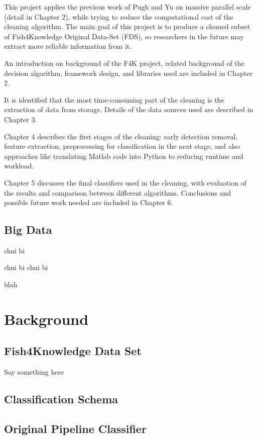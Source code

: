 \documentclass[bsc,logo,twoside,fullspacing,parskip]{infthesis}
\begin{document}

This project applies the previous work of Pugh\cite{P1} and Yu\cite{P3} on massive parallel scale (detail in Chapter 2), while trying to reduce the computational cost of the cleaning algorithm. 
The main goal of this project is to produce a cleaned subset of Fish4Knowledge Original Data-Set (FDS), so researchers in the future may extract more reliable information from it.

An introduction on background of the F4K project, related background of the decision algorithm, framework design, and libraries used are included in Chapter 2.


It is identified that the most time-consuming part of the cleaning is the extraction of data from storage. Details of the data sources used are described in Chapter 3.

Chapter 4 describes the first stages of the cleaning: early detection removal, feature extraction, preprocessing for classification in the next stage, and also approaches like translating Matlab code into Python to reducing runtime and workload.

Chapter 5 discusses the final classifiers used in the cleaning, with evaluation of the results and comparison between different algorithms. Conclusions and possible future work needed are included in Chapter 6.

\section{Big Data}

chui bi

chui bi
chui bi

blah

\chapter{Background}

\section{Fish4Knowledge Data Set}

Say something here

\section{Classification Schema}

\section{Original Pipeline Classifier}
\end{document}
